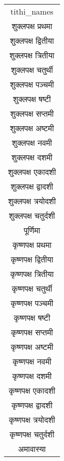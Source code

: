 \begin{table}
\begin{tabular}{c}
tithi_names \\
शुक्लपक्ष प्रथमा \\
शुक्लपक्ष द्वितीया \\
शुक्लपक्ष त्रितीया \\
शुक्लपक्ष चतुर्थी \\
शुक्लपक्ष पञ्चमी \\
शुक्लपक्ष षष्टी \\
शुक्लपक्ष सप्तमी \\
शुक्लपक्ष अष्टमी \\
शुक्लपक्ष नवमी \\
शुक्लपक्ष दशमी \\
शुक्लपक्ष एकादशी \\
शुक्लपक्ष द्वादशी \\
शुक्लपक्ष त्रयोदशी \\
शुक्लपक्ष चतुर्दशी \\
पूर्णिमा  \\
कृष्णपक्ष प्रथमा \\
कृष्णपक्ष द्वितीया \\
कृष्णपक्ष त्रितीया \\
कृष्णपक्ष चतुर्थी \\
कृष्णपक्ष पञ्चमी \\
कृष्णपक्ष षष्टी \\
कृष्णपक्ष सप्तमी \\
कृष्णपक्ष अष्टमी \\
कृष्णपक्ष नवमी \\
कृष्णपक्ष दशमी \\
कृष्णपक्ष एकादशी \\
कृष्णपक्ष द्वादशी \\
कृष्णपक्ष त्रयोदशी \\
कृष्णपक्ष चतुर्दशी \\
अमावास्या \\
\end{tabular}
\end{table}
